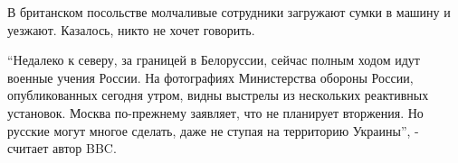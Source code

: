 \begin{multicols}{3}
В британском посольстве молчаливые сотрудники загружают сумки в машину и
уезжают. Казалось, никто не хочет говорить.

\enquote{Недалеко к северу, за границей в Белоруссии, сейчас полным ходом идут военные
учения России. На фотографиях Министерства обороны России, опубликованных
сегодня утром, видны выстрелы из нескольких реактивных установок. Москва
по-прежнему заявляет, что не планирует вторжения. Но русские могут многое
сделать, даже не ступая на территорию Украины}, - считает автор BBC.


\end{multicols} %
